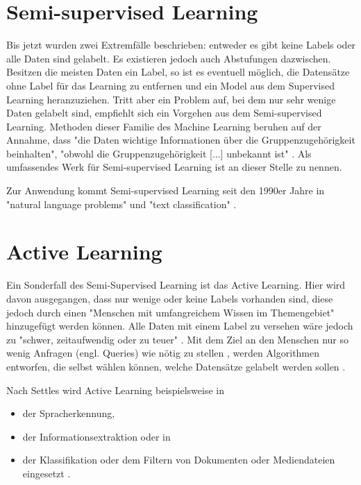 \section{Semi-supervised Learning}\label{sec:ssl1}
Bis jetzt wurden zwei Extremfälle beschrieben: entweder es gibt keine Labels oder alle Daten sind gelabelt. Es existieren jedoch auch Abstufungen dazwischen. Besitzen die meisten Daten ein Label, so ist es eventuell möglich, die Datensätze ohne Label für das Learning zu entfernen und ein Model aus dem Supervised Learning heranzuziehen. Tritt aber ein Problem auf, bei dem nur sehr wenige Daten gelabelt sind, empfiehlt sich ein Vorgehen aus dem Semi-supervised Learning. Methoden dieser Familie des Machine Learning beruhen auf der Annahme, dass "die Daten wichtige Informationen über die Gruppenzugehörigkeit beinhalten", "obwohl die Gruppenzugehörigkeit [...] unbekannt ist" \citep[S.~223; eigene Übersetzung]{ramasubramanian_machine_2017}. Als umfassendes Werk für Semi-supervised Learning ist an dieser Stelle \citep{chapelle_semi-supervised_2006} zu nennen. \par
Zur Anwendung kommt Semi-supervised Learning seit den 1990er Jahre in "natural language problems" und "text classification" \citep[S.~4]{chapelle_semi-supervised_2006}.

\section{Active Learning}\label{sec:al1}
Ein Sonderfall des Semi-Supervised Learning ist das Active Learning. Hier wird davon ausgegangen, dass nur wenige oder keine Labels vorhanden sind, diese jedoch durch einen "Menschen mit umfangreichem Wissen im Themengebiet" \citep[S.~i; eigene Übersetzung]{olsson_literature_2009} hinzugefügt werden können. Alle Daten mit einem Label zu versehen wäre jedoch zu "schwer, zeitaufwendig oder zu teuer" \citep[Abstract; eigene Übersetzung]{settles_active_2010}. Mit dem Ziel an den Menschen nur so wenig Anfragen (engl. Queries) wie nötig zu stellen \citep[Abstract]{olsson_literature_2009}, werden Algorithmen entworfen, die selbst wählen können, welche Datensätze gelabelt werden sollen \citep[Abstract]{settles_active_2010}.\par
Nach Settles wird Active Learning beispielsweise in
\begin{itemize}
\item der Spracherkennung,
\item der Informationsextraktion oder in
\item der Klassifikation oder dem Filtern von Dokumenten oder Mediendateien eingesetzt \citep[S.~4]{settles_active_2010}.
\end{itemize}

